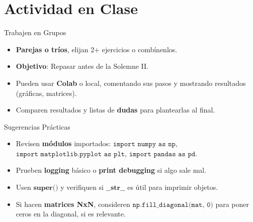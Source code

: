 \documentclass[10pt]{beamer}
\begin{document}
\section{Actividad en Clase}

\begin{frame}{Trabajen en Grupos}
  \begin{itemize}
    \item \textbf{Parejas o tríos}, elijan 2+ ejercicios o combínenlos.
    \item \textbf{Objetivo}: Repasar antes de la Solemne II.
    \item Pueden usar \textbf{Colab} o local, comentando sus pasos y mostrando resultados (gráficas, matrices).
    \item Comparen resultados y listas de \textbf{dudas} para plantearlas al final.
  \end{itemize}
\end{frame}

\begin{frame}{Sugerencias Prácticas}
  \begin{itemize}
    \item Revisen \textbf{módulos} importados: \(\texttt{import numpy as np}\), \(\texttt{import matplotlib.pyplot as plt}\), \(\texttt{import pandas as pd}\).
    \item Prueben \textbf{logging} básico o \textbf{print debugging} si algo sale mal.
    \item Usen \(\textbf{super()}\) y verifiquen si \(\textbf{\_\_str\_\_}\) es útil para imprimir objetos.
    \item Si hacen \textbf{matrices NxN}, consideren \(\texttt{np.fill\_diagonal(mat, 0)}\) para poner ceros en la diagonal, si es relevante.
  \end{itemize}
\end{frame}
\end{document}
